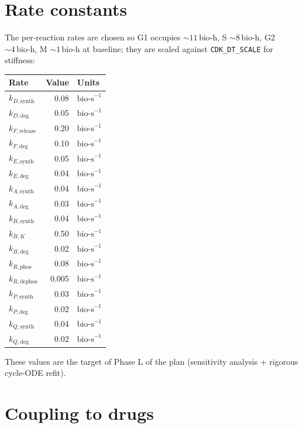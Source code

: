 \documentclass[11pt,letterpaper,twoside,openany]{book}
\newcommand{\code}[1]{\texttt{#1}}
\newcommand{\bioh}{\text{bio-h}}
\newcommand{\biosec}{\text{bio-s}}
\begin{document}
\section{Rate constants}

The per-reaction rates are chosen so G1 occupies
$\sim 11\,\bioh$, S $\sim 8\,\bioh$, G2 $\sim 4\,\bioh$, M
$\sim 1\,\bioh$ at baseline; they are scaled against
\code{CDK\_DT\_SCALE} for stiffness:

\begin{center}
\begin{tabular}{lrl}
\toprule
\textbf{Rate} & \textbf{Value} & \textbf{Units}\\ \midrule
$k_{D,\text{synth}}$  & 0.08  & $\biosec^{-1}$\\
$k_{D,\text{deg}}$    & 0.05  & $\biosec^{-1}$\\
$k_{F,\text{release}}$& 0.20  & $\biosec^{-1}$\\
$k_{F,\text{deg}}$    & 0.10  & $\biosec^{-1}$\\
$k_{E,\text{synth}}$  & 0.05  & $\biosec^{-1}$\\
$k_{E,\text{deg}}$    & 0.04  & $\biosec^{-1}$\\
$k_{A,\text{synth}}$  & 0.04  & $\biosec^{-1}$\\
$k_{A,\text{deg}}$    & 0.03  & $\biosec^{-1}$\\
$k_{B,\text{synth}}$  & 0.04  & $\biosec^{-1}$\\
$k_{B,K}$             & 0.50  & $\biosec^{-1}$\\
$k_{B,\text{deg}}$    & 0.02  & $\biosec^{-1}$\\
$k_{R,\text{phos}}$   & 0.08  & $\biosec^{-1}$\\
$k_{R,\text{dephos}}$ & 0.005 & $\biosec^{-1}$\\
$k_{P,\text{synth}}$  & 0.03  & $\biosec^{-1}$\\
$k_{P,\text{deg}}$    & 0.02  & $\biosec^{-1}$\\
$k_{Q,\text{synth}}$  & 0.04  & $\biosec^{-1}$\\
$k_{Q,\text{deg}}$    & 0.02  & $\biosec^{-1}$\\
\bottomrule
\end{tabular}
\end{center}

These values are the target of Phase L of the plan (sensitivity
analysis + rigorous cycle-ODE refit).

\section{Coupling to drugs}
\end{document}
